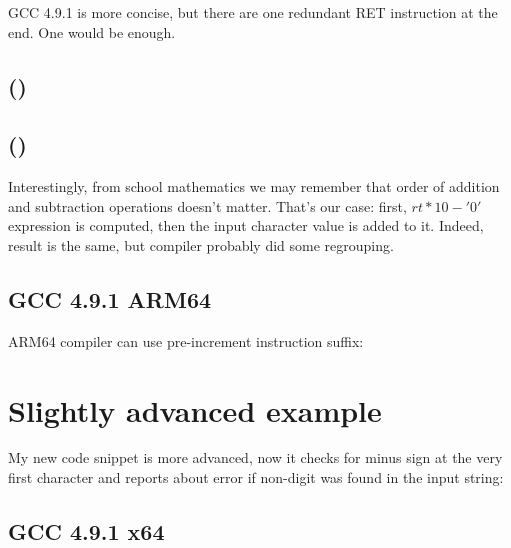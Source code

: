 \Optimizing GCC 4.9.1 is more concise, but there are one redundant RET instruction at the end.
One would be enough.



\subsection{\OptimizingKeilVI (\ARMMode)}



\subsection{\OptimizingKeilVI (\ThumbMode)}



Interestingly, from school mathematics we may remember that order of addition and 
subtraction operations doesn't matter.
That's our case: first, $rt*10 - '0'$ expression is computed, then the input character value is added
to it.
Indeed, result is the same, but compiler probably did some regrouping.

\subsection{\Optimizing GCC 4.9.1 ARM64}

ARM64 compiler can use pre-increment instruction suffix:



\section{Slightly advanced example}

My new code snippet is more advanced, now it checks for minus sign at the very first character
and reports about error if non-digit was found in the input string:



\subsection{\Optimizing GCC 4.9.1 x64}

